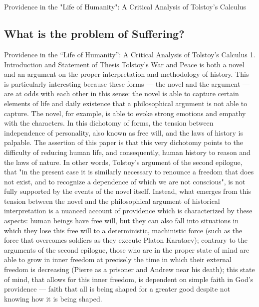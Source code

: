 
\chapter{}
\centerline{Providence in the "Life of Humanity": A Critical Analysis of Tolstoy's Calculus}


\label{}

\section{What is the problem of Suffering?}
Providence in the “Life of Humanity”: A Critical Analysis of Tolstoy’s Calculus
1. Introduction and Statement of Thesis
Tolstoy's War and Peace is both a novel and an argument on the proper interpretation and methodology of history. This is particularly interesting because these forms — the novel and the argument — are at odds with each other in this sense: the novel is able to capture certain elements of life and daily existence that a philosophical argument is not able to capture. The novel, for example, is able to evoke strong emotions and empathy with the characters.  In this dichotomy of forms, the tension between independence of personality, also known as free will, and the laws of history is palpable.  The assertion of this paper is that this very dichotomy points to the difficulty of reducing human life, and consequently, human history to reason and the laws of nature.  In other words, Tolstoy's argument of the second epilogue, that "in the present case it is similarly necessary to renounce a freedom that does not exist, and to recognize a dependence of which we are not conscious", is not fully supported by the events of the novel itself.
 Instead, what emerges from this tension between the novel and the philosophical argument of historical interpretation is a nuanced account of providence which is characterized by these aspects: human beings have free will, but they can also fall into situations in which they lose this free will to a deterministic, machinistic force (such as the force that overcomes soldiers as they execute Platon Karataev); contrary to the arguments of the second epilogue, those who are in the proper state of mind are able to grow in inner freedom at precisely the time in which their external freedom is decreasing (Pierre as a prisoner and Andrew near his death); this state of mind, that allows for this inner freedom, is dependent on simple faith in God’s providence — faith that all is being shaped for a greater good despite not knowing how it is being shaped. 
